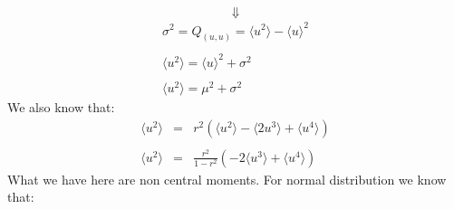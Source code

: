 \documentclass[11pt, a4paper]{article}
\begin{document}
\begin{equation*}
    \Downarrow
\end{equation*}
\begin{equation}
    \begin{array}{c}
        \sigma^2=Q_{\left(u,u\right)}=\langle u^2\rangle-\langle u\rangle^2 \\\\
        \langle u^2\rangle=\langle u\rangle^2+\sigma^2 \\\\
        \langle u^2\rangle=\mu^2+\sigma^2
    \end{array}
\end{equation}
We also know that: 
\begin{equation}
    \begin{array}{rcl}
        \langle u^2\rangle & = & r^2\left(\langle u^2\rangle-\langle 2u^3\rangle+\langle u^4\rangle\right) \\\\
        \langle u^2\rangle & = & \displaystyle\frac{r^2}{1-r^2}\left(-2\langle u^3\rangle+\langle u^4\rangle\right)
        \label{eq: second moment}
    \end{array}
\end{equation}
What we have here are non central moments. For normal distribution we know that:
\end{document}
